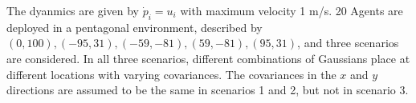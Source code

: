 \documentclass[portrait,fontscale=0.292,paperheight=48in,paperwidth=36in]{baposter}
\begin{document}
\begin{poster}
{\begin{center}
	\end{center}
}

{
	The dyanmics are given by $\dot{p}_i = u_i$ with maximum velocity 1 m/s. 20 Agents are deployed in a pentagonal environment, described by $(0,100), (-95,31), (-59,-81), (59,-81), (95,31)$, and three scenarios are considered. In all three scenarios, different combinations of Gaussians place at different locations with varying covariances. The covariances in the $x$ and $y$ directions are assumed to be the same in scenarios 1 and 2, but not in scenario 3.
}

{
	\small
	\nocite{*}
	
	
	\vspace{0.3em}
}

\end{poster}
\end{document}
